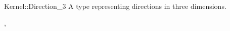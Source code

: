 \begin{ccRefConcept}{Kernel::Direction_3}
A type representing directions in three dimensions.

\ccRefines
{},

\ccSeeAlso
{}

\end{ccRefConcept}
